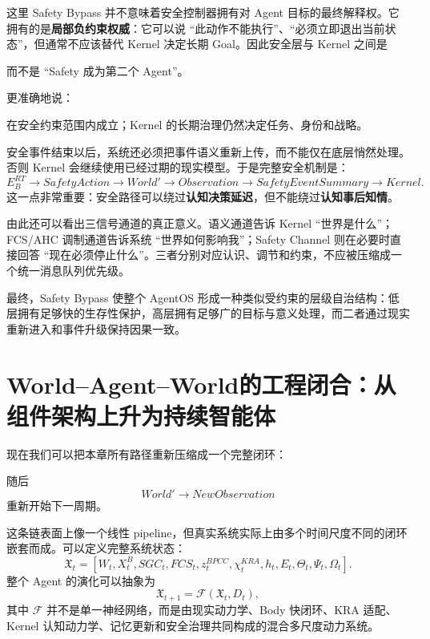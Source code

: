 这里 Safety Bypass 并不意味着安全控制器拥有对 Agent 目标的最终解释权。它拥有的是\textbf{局部负约束权威}：它可以说 ``此动作不能执行''、``必须立即退出当前状态''，但通常不应该替代 Kernel 决定长期 Goal。因此安全层与 Kernel 之间是
\begin{statementbox}
\centering
{}
\end{statementbox}
而不是 ``Safety 成为第二个 Agent''。

更准确地说：
\begin{statementbox}
\centering
{}
\end{statementbox}
在安全约束范围内成立；Kernel 的长期治理仍然决定任务、身份和战略。

安全事件结束以后，系统还必须把事件语义重新上传，而不能仅在底层悄然处理。否则 Kernel 会继续使用已经过期的现实模型。于是完整安全机制是：
\[
E_B^{RT}
\rightarrow
SafetyAction
\rightarrow
World'
\rightarrow
Observation
\rightarrow
SafetyEventSummary
\rightarrow
Kernel .
\]
这一点非常重要：安全路径可以绕过\textbf{认知决策延迟}，但不能绕过\textbf{认知事后知情}。

由此还可以看出三信号通道的真正意义。语义通道告诉 Kernel ``世界是什么''；FCS/AHC 调制通道告诉系统 ``世界如何影响我''；Safety Channel 则在必要时直接回答 ``现在必须停止什么''。三者分别对应认识、调节和约束，不应被压缩成一个统一消息队列优先级。

最终，Safety Bypass 使整个 AgentOS 形成一种类似受约束的层级自治结构：低层拥有足够快的生存性保护，高层拥有足够广的目标与意义处理，而二者通过现实重新进入和事件升级保持因果一致。


\section{World--Agent--World的工程闭合：从组件架构上升为持续智能体}

现在我们可以把本章所有路径重新压缩成一个完整闭环：
\begin{statementbox}
\centering
{}
\end{statementbox}
随后
\[
World'
\rightarrow
NewObservation
\]
重新开始下一周期。

这条链表面上像一个线性 pipeline，但真实系统实际上由多个时间尺度不同的闭环嵌套而成。可以定义完整系统状态：
\[
\mathfrak X_t
=
\left[
W_t,
X^B_t,
SGC_t,
FCS_t,
z^{BPCC}_t,
\chi^{KRA}_t,
h_t,
E_t,
\Theta_t,
\Psi_t,
\Omega_t
\right].
\]
整个 Agent 的演化可以抽象为
\[
\mathfrak X_{t+1}
=
\mathcal F
\left(
\mathfrak X_t,
D_t
\right),
\]
其中 $\mathcal F$ 并不是单一神经网络，而是由现实动力学、Body 快闭环、KRA 适配、Kernel 认知动力学、记忆更新和安全治理共同构成的混合多尺度动力系统。


